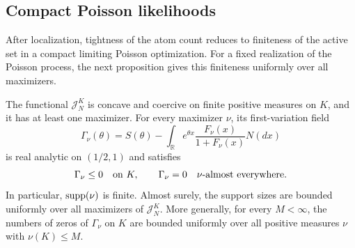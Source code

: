 \subsection{Compact Poisson likelihoods}

After localization, tightness of the atom count reduces to finiteness of the
active set in a compact limiting Poisson optimization. For a fixed realization
of the Poisson process, the next proposition gives this finiteness uniformly
over all maximizers.
\begin{proposition}
\label{prop:support-one-d-analytic-active-set}
The functional \(\mathcal J_N^K\) is concave and coercive on finite positive
measures on \(K\), and it has at least one maximizer. For every maximizer
\(\nu\), its first-variation field
\begin{equation}
\label{eq:support-one-d-limit-kkt}
    \Gamma_\nu(\theta)
    =S(\theta)-\int_{\mathbb R}
       e^{\theta x}\frac{F_\nu(x)}{1+F_\nu(x)}N(dx)
\end{equation}
is real analytic on \((1/2,1)\) and satisfies
\[
    \Gamma_\nu\le0\quad\hbox{on }K,
    \qquad
    \Gamma_\nu=0\quad\nu\hbox{-almost everywhere}.
\]
In particular, \(\operatorname{supp}(\nu)\) is finite. Almost surely, the support sizes are
bounded uniformly over all maximizers of \(\mathcal J_N^K\). More generally,
for every \(M<\infty\), the numbers of zeros of \(\Gamma_\nu\) on \(K\) are
bounded uniformly over all positive measures \(\nu\) with \(\nu(K)\le M\).
\end{proposition}

